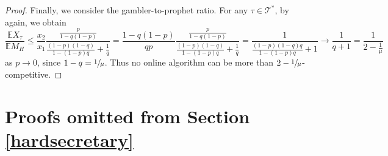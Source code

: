\documentclass[11pt, a4paper, twoside]{article}
\newcommand{\EE}{\mathbb{E}}
\newcommand{\TT}{\mathcal{T}}
\numberwithin{equation}{section}
\begin{document}
\begin{proof}
		Finally, we consider the gambler-to-prophet ratio. For any $\tau\in\TT^*$, by  again, we obtain
		\[\frac{\EE X_\tau}{\EE M_H}\leq\frac{x_2}{x_1}\frac{\frac{p}{1-q(1-p)}}{\frac{(1-p)(1-q)}{1-(1-p)q}+\frac{1}{q}}=\frac{1-q(1-p)}{qp}\frac{\frac{p}{1-q(1-p)}}{\frac{(1-p)(1-q)}{1-(1-p)q}+\frac{1}{q}}=\frac{1}{\frac{(1-p)(1-q)q}{1-(1-p)q}+1}\longrightarrow \frac{1}{q+1}=\frac{1}{2-\frac{1}{\mu}}\]
		as $p\longrightarrow 0$, since $1-q=\sfrac{1}{\mu}$. Thus no online algorithm can be more than $2-\sfrac{1}{\mu}$-competitive.
	\end{proof}
 
        \section{Proofs omitted from Section \ref{hardsecretary}}\label{supphardsecretary}
        
\end{document}
